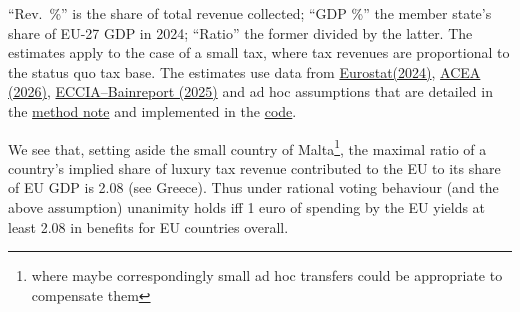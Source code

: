\documentclass[../../main]{subfiles}
\begin{document}
\begin{table}[htbp]
\vspace{4pt}
\begin{minipage}{0.95\linewidth}
\footnotesize
``Rev.\ \%'' is the share of total revenue collected; ``GDP \%'' the member
state's share of EU-27 GDP in 2024; ``Ratio'' the former divided by the latter.
The estimates apply to the case of a small tax, where tax revenues are proportional to the status quo tax base. The estimates use data from \href{https://ec.europa.eu/eurostat/statistics-explained/index.php?title=Tourism_statistics}{Eurostat(2024)}, \href{https://www.acea.auto/pc-registrations/new-car-registrations-1-8-in-2025-battery-electric-17-4-market-share/}{ACEA (2026)}, \href{https://www.eccia.eu/assets/activities/files/ECCIA\%20Bain\%20Report_Walpole\%20FINAL\%20Digital\%20Singles.pdf}{ECCIA--Bainreport (2025)} %
and ad hoc assumptions that are detailed in the \href{https://github.com/Montagnard/rapport-GRA-ft.-GC/blob/main/annexes/luxury/methodology/luxury_good_data_method.txt}{method note} and implemented in the \href{https://github.com/Montagnard/rapport-GRA-ft.-GC/blob/main/annexes/luxury/methodology/luxury_good_data.py}{code}.
\end{minipage}

\label{tab:countryalloc}
\end{table}

We see that, setting aside the small country of Malta\footnote{where maybe correspondingly small ad hoc transfers could be appropriate to compensate them}, %
the maximal ratio of a country's implied share of luxury tax revenue contributed to the EU to its share of EU GDP is 2.08 (see Greece). Thus under rational voting behaviour (and the above assumption) unanimity holds iff 1 euro of spending by the EU yields at least 2.08 in benefits for EU countries overall.
\end{document}
